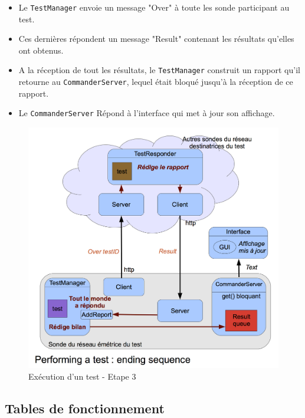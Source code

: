 \documentclass[a4paper,11pt]{article}
\begin{document}
\begin{itemize}
\item Le \texttt{TestManager} envoie un message "Over" à toute les sonde participant au test.
\item Ces dernières répondent un message "Result" contenant les résultats qu'elles ont obtenus.
\item A la réception de tout les résultats, le \texttt{TestManager} construit un rapport qu'il retourne au \texttt{CommanderServer}, lequel était bloqué jusqu'à la réception de ce rapport.
\item Le \texttt{CommanderServer} Répond à l'interface qui met à jour son affichage.
\end{itemize}

\begin{figure}[!ht]
\centering\includegraphics[width=0.8\linewidth]{img/graphTest3.png}
\caption{Exécution d'un test - Etape 3}
\end{figure}

\FloatBarrier

\subsection{Tables de fonctionnement}
\end{document}
